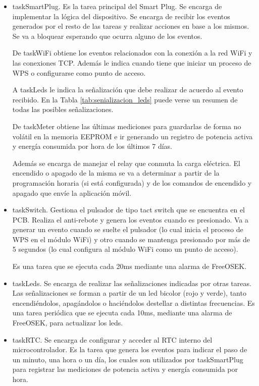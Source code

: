 \begin{itemize}
\item taskSmartPlug. Es la tarea principal del Smart Plug. Se encarga de implementar la lógica del dispositivo. Se encarga de recibir los eventos generados por el resto de las tareas y realizar acciones en base a los mismos. Se va a bloquear esperando que ocurra alguno de los eventos. 

De taskWiFi obtiene los eventos relacionados con la conexión a la red WiFi y las conexiones TCP. Además le indica cuando tiene que iniciar un proceso de WPS o configurarse como punto de acceso.

A taskLeds le indica la señalización que debe realizar de acuerdo al evento recibido. En la Tabla \ref{tab:senializacion_leds} puede verse un resumen de todas las posibles señalizaciones.


De taskMeter obtiene las últimas mediciones para guardarlas de forma no volátil en la memoria EEPROM e ir generando un registro de potencia activa y energía consumida por hora de los últimos 7 días.

Además se encarga de manejar el relay que conmuta la carga eléctrica. El encendido o apagado de la misma se va a determinar a partir de la programación horaria (si está configurada) y de los comandos de encendido y apagado que envíe la aplicación móvil.

\item taskSwitch. Gestiona el pulsador de tipo tact switch que se encuentra en el PCB. Realiza el anti-rebote y genera los eventos cuando es presionado. Va a generar un evento cuando se suelte el pulsador (lo cual inicia el proceso de WPS en el módulo WiFi) y otro cuando se mantenga presionado por más de 5 segundos (lo cual configura al módulo WiFi como un punto de acceso). 

Es una tarea que se ejecuta cada 20ms mediante una alarma de FreeOSEK.


\item taskLeds. Se encarga de realizar las señalizaciones indicadas por otras tareas. Las señalizaciones se forman a partir de un led bicolor (rojo y verde), tanto encendiéndolos, apagándolos o haciéndolos destellar a distintas frecuencias.
Es una tarea periódica que se ejecuta cada 10ms, mediante una alarma de FreeOSEK, para actualizar los leds.


\item taskRTC. Se encarga de configurar y acceder al RTC interno del microcontrolador. Es la tarea que genera los eventos para indicar el paso de un minuto, una hora o un día, los cuales son utilizados por taskSmartPlug para registrar las mediciones de potencia activa y energía consumida por hora.


\end{itemize}
